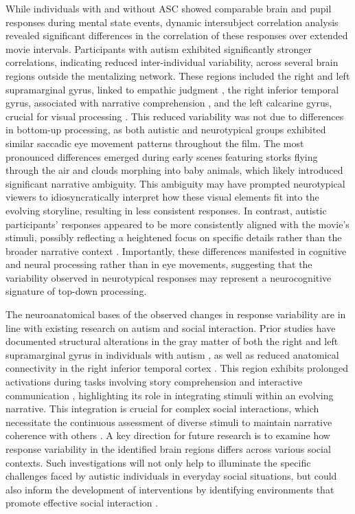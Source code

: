 While individuals with and without ASC showed comparable brain and pupil responses during mental state events, dynamic intersubject correlation analysis revealed significant differences in the correlation of these responses over extended movie intervals. Participants with autism exhibited significantly stronger correlations, indicating reduced inter-individual variability, across several brain regions outside the mentalizing network. These regions included the right and left supramarginal gyrus, linked to empathic judgment \citep{silani2013,wada2021}, the right inferior temporal gyrus, associated with narrative comprehension \citep{youssofzadeh2022}, and the left calcarine gyrus, crucial for visual processing \citep{woldorff2002}. This reduced variability was not due to differences in bottom-up processing, as both autistic and neurotypical groups exhibited similar saccadic eye movement patterns throughout the film. The most pronounced differences emerged during early scenes featuring storks flying through the air and clouds morphing into baby animals, which likely introduced significant narrative ambiguity. This ambiguity may have prompted neurotypical viewers to idiosyncratically interpret how these visual elements fit into the evolving storyline, resulting in less consistent responses. In contrast, autistic participants' responses appeared to be more consistently aligned with the movie's stimuli, possibly reflecting a heightened focus on specific details rather than the broader narrative context \citep{losh2003,tager-flusberg1995,barnes2012,geelhand2020,koldewyn2014}. Importantly, these differences manifested in cognitive and neural processing rather than in eye movements, suggesting that the variability observed in neurotypical responses may represent a neurocognitive signature of top-down processing.

The neuroanatomical bases of the observed changes in response variability are in line with existing research on autism and social interaction. Prior studies have documented structural alterations in the gray matter of both the right and left supramarginal gyrus in individuals with autism \citep{brieber2007,ke2008,libero2014}, as well as reduced anatomical connectivity in the right inferior temporal cortex \citep{boets2018,koldewyn2014}. This region exhibits prolonged activations during tasks involving story comprehension and interactive communication \citep{youssofzadeh2022,stolk2013neural}, highlighting its role in integrating stimuli within an evolving narrative. This integration is crucial for complex social interactions, which necessitate the continuous assessment of diverse stimuli to maintain narrative coherence with others \citep{goffman1974,johnson2023,stolk2022}. A key direction for future research is to examine how response variability in the identified brain regions differs across various social contexts. Such investigations will not only help to illuminate the specific challenges faced by autistic individuals in everyday social situations, but could also inform the development of interventions by identifying environments that promote effective social interaction \citep{wadge2019}.


